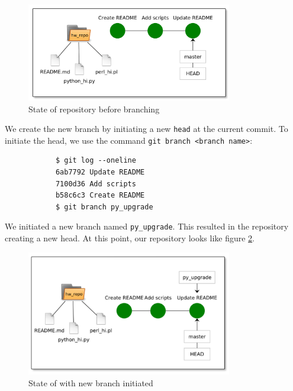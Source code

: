 \documentclass[../main/git_course_main.tex]{subfiles}
\begin{document}
	\begin{figure}[h!]
		\centering
		\includegraphics[width=0.8\textwidth]{../visualizations/chapter2/c26_repo_third_commit.pdf}
		\caption{State of repository before branching}
		\label{fig:state_before_branching}
	\end{figure}
	
	We create the new branch by initiating a new \verb$head$ at the current commit. To initiate the head, we use the command \verb$git branch <branch name>$:
	
	\begin{codebox}
		\begin{lstlisting}
			$ git log --oneline
			6ab7792 Update README
			7100d36 Add scripts
			b58c6c3 Create README
			$ git branch py_upgrade
		\end{lstlisting}
	\end{codebox}
	
	We initiated a new branch named \verb$py_upgrade$. This resulted in the repository creating a new head. At this point, our repository looks like figure \ref{fig:branch_initiated}.
	
	\begin{figure}[h!]
		\centering
		\includegraphics[width=0.8\textwidth]{../visualizations/chapter4/42_branch_initiated.pdf}
		\caption{State of with new branch initiated}
		\label{fig:branch_initiated}
	\end{figure}
	
\end{document}
